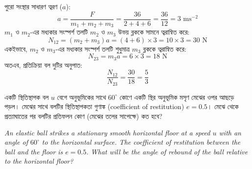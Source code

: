 \documentclass[12pt, a4paper]{article}
\begin{document}
\begin{tcolorbox}[solutionbox={সমাধান (Solution)}]
\noindent
পুরো সংস্থার সাধারণ ত্বরণ ($a$):
$$a = \frac{F}{m_1 + m_2 + m_3} = \frac{36}{2 + 4 + 6} = \frac{36}{12} = 3\text{ ms}^{-2}$$
$m_1$ ও $m_2$-এর মধ্যকার সংস্পর্শ তলটি $m_2$ ও $m_3$ উভয় ব্লককে সামনে ত্বরান্বিত করে:
$$N_{12} = (m_2 + m_3) a = (4 + 6) \times 3 = 10 \times 3 = 30\text{ N}$$
একইভাবে, $m_2$ ও $m_3$-এর মধ্যকার সংস্পর্শ তলটি শুধুমাত্র $m_3$ ব্লককে ত্বরান্বিত করে:
$$N_{23} = m_3 a = 6 \times 3 = 18\text{ N}$$
অতএব, প্রতিক্রিয়া বল দুটির অনুপাত:
$$\frac{N_{12}}{N_{23}} = \frac{30}{18} = \frac{5}{3}$$
\end{tcolorbox}

\begin{tcolorbox}[questionbox={প্রশ্ন (Question) 21}]
\noindent
একটি স্থিতিস্থাপক বল $u$ বেগে অনুভূমিকের সাথে $60^\circ$ কোণে একটি স্থির অনুভূমিক মসৃণ মেঝের ওপর আছড়ে পড়ল। মেঝের সাথে বলটির স্থিতিস্থাপকতা গুণাঙ্ক (coefficient of restitution) $e = 0.5$। মেঝে থেকে প্রত্যাঘাতের পর বলটির প্রতিফলন কোণ (মেঝের তলের সাপেক্ষে) কত হবে?

\vspace{0.8em}
\begin{english}
\noindent\textit{\color{darkgray}
An elastic ball strikes a stationary smooth horizontal floor at a speed $u$ with an angle of $60^\circ$ to the horizontal surface. The coefficient of restitution between the ball and the floor is $e = 0.5$. What will be the angle of rebound of the ball relative to the horizontal floor?
}
\end{english}
\end{tcolorbox}
\end{document}
